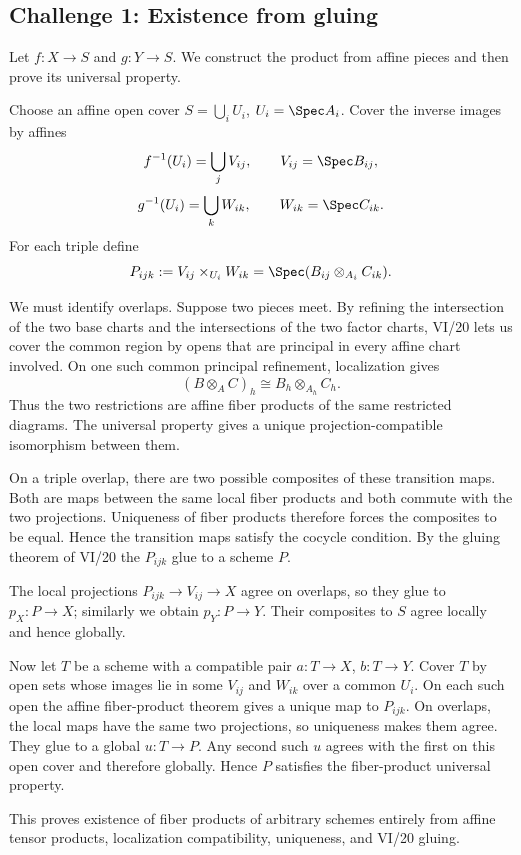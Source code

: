 \subsection*{Challenge 1: Existence from gluing}
\begin{solution}
Let $f:X\to S$ and $g:Y\to S$.  We construct the product from affine pieces and then prove its
universal property.

Choose an affine open cover $S=\bigcup_iU_i$, $U_i=\Spec A_i$.  Cover the inverse images by
affines
\[
f^{-1}(U_i)=\bigcup_jV_{ij},\qquad V_{ij}=\Spec B_{ij},
\]
\[
g^{-1}(U_i)=\bigcup_kW_{ik},\qquad W_{ik}=\Spec C_{ik}.
\]
For each triple define
\[
P_{ijk}:=V_{ij}\times_{U_i}W_{ik}
=\Spec(B_{ij}\otimes_{A_i}C_{ik}).
\]

We must identify overlaps.  Suppose two pieces meet.  By refining the intersection of the two base
charts and the intersections of the two factor charts, VI/20 lets us cover the common region by
opens that are principal in every affine chart involved.  On one such common principal refinement,
localization gives
\[
(B\otimes_AC)_h
\cong
B_h\otimes_{A_h}C_h.
\]
Thus the two restrictions are affine fiber products of the same restricted diagrams.  The
universal property gives a unique projection-compatible isomorphism between them.

On a triple overlap, there are two possible composites of these transition maps.  Both are maps
between the same local fiber products and both commute with the two projections.  Uniqueness of
fiber products therefore forces the composites to be equal.  Hence the transition maps satisfy
the cocycle condition.  By the gluing theorem of VI/20 the $P_{ijk}$ glue to a scheme $P$.

The local projections $P_{ijk}\to V_{ij}\to X$ agree on overlaps, so they glue to
$p_X:P\to X$; similarly we obtain $p_Y:P\to Y$.  Their composites to $S$ agree locally and hence
globally.

Now let $T$ be a scheme with a compatible pair $a:T\to X$, $b:T\to Y$.  Cover $T$ by open sets
whose images lie in some $V_{ij}$ and $W_{ik}$ over a common $U_i$.  On each such open the affine
fiber-product theorem gives a unique map to $P_{ijk}$.  On overlaps, the local maps have the same
two projections, so uniqueness makes them agree.  They glue to a global $u:T\to P$.  Any second
such $u$ agrees with the first on this open cover and therefore globally.  Hence $P$ satisfies the
fiber-product universal property.

This proves existence of fiber products of arbitrary schemes entirely from affine tensor products,
localization compatibility, uniqueness, and VI/20 gluing.
\end{solution}

